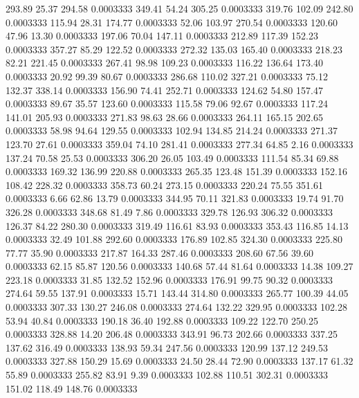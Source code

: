  293.89   25.37  294.58   0.0003333
 349.41   54.24  305.25   0.0003333
 319.76  102.09  242.80   0.0003333
 115.94   28.31  174.77   0.0003333
  52.06  103.97  270.54   0.0003333
 120.60   47.96   13.30   0.0003333
 197.06   70.04  147.11   0.0003333
 212.89  117.39  152.23   0.0003333
 357.27   85.29  122.52   0.0003333
 272.32  135.03  165.40   0.0003333
 218.23   82.21  221.45   0.0003333
 267.41   98.98  109.23   0.0003333
 116.22  136.64  173.40   0.0003333
  20.92   99.39   80.67   0.0003333
 286.68  110.02  327.21   0.0003333
  75.12  132.37  338.14   0.0003333
 156.90   74.41  252.71   0.0003333
 124.62   54.80  157.47   0.0003333
  89.67   35.57  123.60   0.0003333
 115.58   79.06   92.67   0.0003333
 117.24  141.01  205.93   0.0003333
 271.83   98.63   28.66   0.0003333
 264.11  165.15  202.65   0.0003333
  58.98   94.64  129.55   0.0003333
 102.94  134.85  214.24   0.0003333
 271.37  123.70   27.61   0.0003333
 359.04   74.10  281.41   0.0003333
 277.34   64.85    2.16   0.0003333
 137.24   70.58   25.53   0.0003333
 306.20   26.05  103.49   0.0003333
 111.54   85.34   69.88   0.0003333
 169.32  136.99  220.88   0.0003333
 265.35  123.48  151.39   0.0003333
 152.16  108.42  228.32   0.0003333
 358.73   60.24  273.15   0.0003333
 220.24   75.55  351.61   0.0003333
   6.66   62.86   13.79   0.0003333
 344.95   70.11  321.83   0.0003333
  19.74   91.70  326.28   0.0003333
 348.68   81.49    7.86   0.0003333
 329.78  126.93  306.32   0.0003333
 126.37   84.22  280.30   0.0003333
 319.49  116.61   83.93   0.0003333
 353.43  116.85   14.13   0.0003333
  32.49  101.88  292.60   0.0003333
 176.89  102.85  324.30   0.0003333
 225.80   77.77   35.90   0.0003333
 217.87  164.33  287.46   0.0003333
 208.60   67.56   39.60   0.0003333
  62.15   85.87  120.56   0.0003333
 140.68   57.44   81.64   0.0003333
  14.38  109.27  223.18   0.0003333
  31.85  132.52  152.96   0.0003333
 176.91   99.75   90.32   0.0003333
 274.64   59.55  137.91   0.0003333
  15.71  143.44  314.80   0.0003333
 265.77  100.39   44.05   0.0003333
 307.33  130.27  246.08   0.0003333
 274.64  132.22  329.95   0.0003333
 102.28   53.94   40.84   0.0003333
 190.18   36.40  192.88   0.0003333
 109.22  122.70  250.25   0.0003333
 328.88   14.20  206.48   0.0003333
 343.91   96.73  202.66   0.0003333
 337.25  137.62  316.49   0.0003333
 138.93   59.34  247.56   0.0003333
 120.99  137.12  249.53   0.0003333
 327.88  150.29   15.69   0.0003333
  24.50   28.44   72.90   0.0003333
 137.17   61.32   55.89   0.0003333
 255.82   83.91    9.39   0.0003333
 102.88  110.51  302.31   0.0003333
 151.02  118.49  148.76   0.0003333
